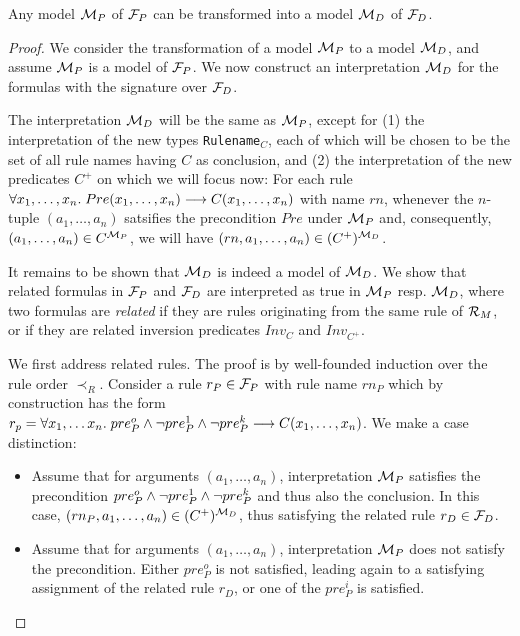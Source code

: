 \begin{lemma}\label{lemma:mp_to_md}
  Any model ${\cal M}_P$ of ${\cal F}_P$ can be transformed into a model
  ${\cal M}_D$ of ${\cal F}_D$.
\end{lemma}

\begin{proof}
  We consider the transformation of a model ${\cal M}_P$ to a model
  ${\cal M}_D$, and assume ${\cal M}_P$ is a model of ${\cal F}_P$. 
  We now construct an interpretation ${\cal M}_D$ for the formulas with the
  signature over ${\cal F}_D$.

  The interpretation ${\cal M}_D$ will be the same as ${\cal M}_P$,
  except for (1) the interpretation of the new types \texttt{Rulename$_C$},
  each of which will be chosen to be the set of all rule names having $C$ as
  conclusion, and (2) the interpretation of the new predicates $C^+$ on which
  we will focus now: 
  For each rule  $\forall x_1, \dots, x_n.\; Pre(x_1,
  \dots, x_n) \longrightarrow C(x_1, \dots, x_n)$ with name  $rn$, whenever the $n$-tuple
  $(a_1, \dots, a_n)$ satsifies the precondition $Pre$ under ${\cal M}_P$ and, consequently,
  $(a_1, \dots, a_n) \in C^{{\cal M}_P}$, we will have   $(rn, a_1, \dots, a_n) \in (C^+)^{{\cal M}_D}$.

  It remains to be shown that ${\cal M}_D$ is indeed a model of ${\cal
    M}_D$. We show that related formulas in ${\cal F}_P$ and ${\cal F}_D$
  are interpreted as true in ${\cal M}_P$ resp.{} ${\cal M}_D$, where two
  formulas are \emph{related} if they are rules originating from the same rule
  of ${\cal R}_M$, or if they are related inversion predicates $Inv_C$ and $Inv_{C^+}$.

  We first address related rules. The proof is by well-founded induction over
  the rule order $\prec_R$. Consider a rule $r_P \in {\cal F}_P$ with rule
  name $rn_P$ which by construction has the form
  $r_p = \forall x_1, \dots x_n.\; pre_P^o \land \lnot pre_P^1 \land \lnot pre_P^k
  \longrightarrow C(x_1, \dots, x_n)$.
  We make a case distinction:
  \begin{itemize}
  \item Assume that for arguments $(a_1, \dots, a_n)$, interpretation
    ${\cal M}_P$ satisfies the precondition
    $pre_P^o \land \lnot pre_P^1 \land \lnot pre_P^k$ and thus also the
    conclusion. In this case, $(rn_P, a_1, \dots, a_n)\in (C^+)^{{\cal M}_D}$, thus
    satisfying the related rule $r_D \in {\cal F}_D$.
  \item Assume that for arguments $(a_1, \dots, a_n)$, interpretation
    ${\cal M}_P$ does not satisfy the precondition. Either $pre_P^o$ is not
    satisfied, leading again to a satisfying assignment of the related rule
    $r_D$, or one of the $pre_P^i$ is satisfied.


\end{itemize}
\end{proof}
